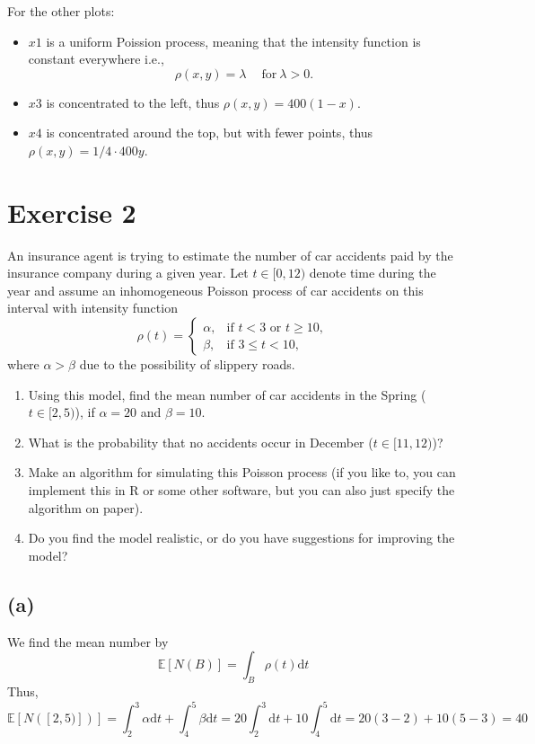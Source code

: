 \documentclass{article}
\begin{document}
For the other plots:
\begin{itemize}
    \item $x1$ is a uniform Poission process, meaning that the intensity function is constant everywhere i.e.,
    \[ 
    \rho(x,y)=\lambda\ \quad \text{for}\ \lambda> 0.
    \]
    \item $x3$ is concentrated to the left, thus $\rho(x,y)=400(1-x)$.
    \item $x4$ is concentrated around the top, but with fewer points, thus $\rho(x,y)=1/4\cdot 400 y$.
\end{itemize}




\section*{Exercise 2}
An insurance agent is trying to estimate the number of car accidents paid by the insurance company during a given year. Let $t \in [0, 12)$ denote time during the year and assume an inhomogeneous Poisson process of car accidents on this interval with intensity function
\[
\rho(t) = \begin{cases} 
\alpha, & \text{if } t < 3 \text{ or } t \geq 10, \\
\beta, & \text{if } 3 \leq t < 10,
\end{cases}
\]
where $\alpha > \beta$ due to the possibility of slippery roads.

\begin{enumerate}
    \item[(a)] Using this model, find the mean number of car accidents in the Spring ($t \in [2,5)$), if $\alpha = 20$ and $\beta = 10$.
    \item[(b)] What is the probability that no accidents occur in December ($t \in [11, 12)$)?
    \item[(c)] Make an algorithm for simulating this Poisson process (if you like to, you can implement this in R or some other software, but you can also just specify the algorithm on paper).
    \item[(d)] Do you find the model realistic, or do you have suggestions for improving the model?
\end{enumerate}

\subsection*{(a)}
We find the mean number by 
\[
\mathbb{E}[N(B)]=\int_B \rho(t)\text{d}t
\]
Thus,
\[
    \mathbb{E}[N([2,5)])]= \int_{2}^{3}\alpha \text{d}t+\int_{4}^{5}\beta\text{d}t=20\int_{2}^{3}\text{d}t+10\int_{4}^{5}\text{d}t= 20(3-2)+10(5-3)=40
\]
\end{document}

